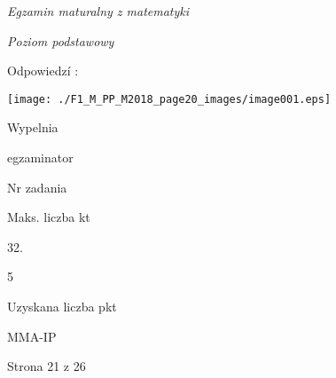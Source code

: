 \documentclass[a4paper,12pt]{article}
\begin{document}
{\it Egzamin maturalny z matematyki}

{\it Poziom podstawowy}

Odpowiedzí :
\begin{center}
\texttt{[image: ./F1\_M\_PP\_M2018\_page20\_images/image001.eps]}
\end{center}
Wypelnia

egzaminator

Nr zadania

Maks. liczba kt

32.

5

Uzyskana liczba pkt

MMA-IP

Strona 21 z 26
\end{document}
